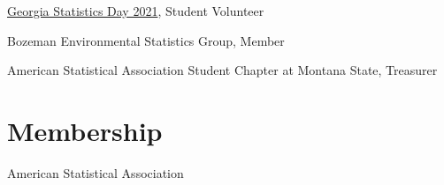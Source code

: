 \documentclass{wm_cv}
\begin{document}
\href{https://www.stat.uga.edu/events/content/2021/georgia-statistics-day-2021}{Georgia Statistics Day 2021}, Student Volunteer \hfill  {}

Bozeman Environmental Statistics Group, Member \hfill  {}

American Statistical Association Student Chapter at Montana State, Treasurer \hfill  {}

\section{Membership}

American Statistical Association \\
\end{document}
